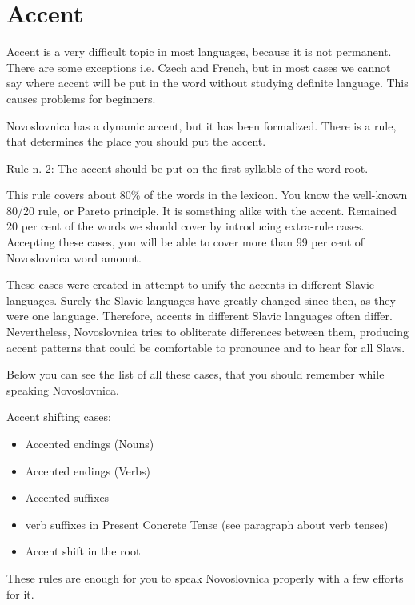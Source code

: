 \section{Accent}

Accent is a very difficult topic in most languages, because it is not permanent. There are some exceptions i.e. Czech and French, but in most cases we cannot say where accent will be put in the word without studying definite language. This causes problems for beginners.

Novoslovnica has a dynamic accent, but it has been formalized. There is a rule, that determines the place you should put the accent. 

{Rule n. 2}: The accent should be put on the first syllable of the word root.

This rule covers about 80\% of the words in the lexicon. You know the well-known 80/20 rule, or Pareto principle. It is something alike with the accent. Remained 20 per cent of the words we should cover by introducing extra-rule cases. Accepting these cases, you will be able to cover more than 99 per cent of Novoslovnica word amount.

These cases were created in attempt to unify the accents in different Slavic languages. Surely the Slavic languages have greatly changed since then, as they were one language. Therefore, accents in different Slavic languages often differ. Nevertheless, Novoslovnica tries to obliterate differences between them, producing accent patterns that could be comfortable to pronounce and to hear for all Slavs.

Below you can see the list of all these cases, that you should remember while speaking Novoslovnica.

Accent shifting cases:

\begin{itemize}
	\item{Accented endings (Nouns)}
	\item{Accented endings (Verbs)}
	\item{Accented suffixes}
	\item{verb suffixes in Present Concrete Tense (see paragraph about verb tenses)}
	\item{Accent shift in the root}
\end{itemize}

These rules are enough for you to speak Novoslovnica properly with a few efforts for it. 
